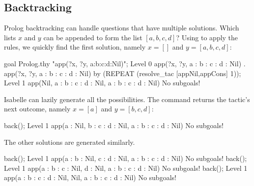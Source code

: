 \subsection{Backtracking}
Prolog backtracking can handle questions that have multiple solutions.
Which lists $x$ and $y$ can be appended to form the list $[a,b,c,d]$?
Using  to apply the rules, we quickly find the first
solution, namely $x=[]$ and $y=[a,b,c,d]$:
\begin{ttbox}
goal Prolog.thy "app(?x, ?y, a:b:c:d:Nil)";
{\out Level 0}
{\out app(?x, ?y, a : b : c : d : Nil)}
{. app(?x, ?y, a : b : c : d : Nil)}
\ttbreak
by (REPEAT (resolve_tac [appNil,appCons] 1));
{\out Level 1}
{\out app(Nil, a : b : c : d : Nil, a : b : c : d : Nil)}
{\out No subgoals!}
\end{ttbox}
Isabelle can lazily generate all the possibilities.  The 
command returns the tactic's next outcome, namely $x=[a]$ and $y=[b,c,d]$:
\begin{ttbox}
back();
{\out Level 1}
{\out app(a : Nil, b : c : d : Nil, a : b : c : d : Nil)}
{\out No subgoals!}
\end{ttbox}
The other solutions are generated similarly.
\begin{ttbox}
back();
{\out Level 1}
{\out app(a : b : Nil, c : d : Nil, a : b : c : d : Nil)}
{\out No subgoals!}
\ttbreak
back();
{\out Level 1}
{\out app(a : b : c : Nil, d : Nil, a : b : c : d : Nil)}
{\out No subgoals!}
\ttbreak
back();
{\out Level 1}
{\out app(a : b : c : d : Nil, Nil, a : b : c : d : Nil)}
{\out No subgoals!}
\end{ttbox}


